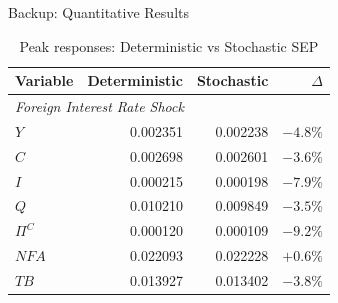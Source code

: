\documentclass[aspectratio=169,12pt]{beamer}
\begin{document}

\appendix

\begin{frame}{Backup: Quantitative Results}

\begin{table}
\centering
\small
\begin{tabular}{lrrr}
\toprule
\textbf{Variable} & \textbf{Deterministic} & \textbf{Stochastic} & \textbf{$\Delta$} \\
\midrule
\multicolumn{4}{l}{\textit{Foreign Interest Rate Shock}} \\
$Y$ & 0.002351 & 0.002238 & $-4.8\%$ \\
$C$ & 0.002698 & 0.002601 & $-3.6\%$ \\
$I$ & 0.000215 & 0.000198 & $-7.9\%$ \\
$Q$ & 0.010210 & 0.009849 & $-3.5\%$ \\
$\Pi^C$ & 0.000120 & 0.000109 & $-9.2\%$ \\
$NFA$ & 0.022093 & 0.022228 & $+0.6\%$ \\
$TB$ & 0.013927 & 0.013402 & $-3.8\%$ \\
\bottomrule
\end{tabular}
\caption{Peak responses: Deterministic vs Stochastic SEP}
\end{table}

\end{frame}
\end{document}
